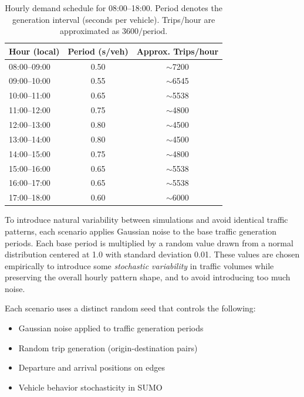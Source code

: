 \begin{table}[htbp]
    \centering
    \caption{Hourly demand schedule for 08:00--18:00. Period denotes the generation interval (seconds per vehicle). Trips/hour are approximated as $3600/\text{period}$.}
    \label{tab:hourly_schedule}
    \vspace{0.5em}
    \begin{tabular}{lcc}
        \toprule
        \textbf{Hour (local)} & \textbf{Period (s/veh)} & \textbf{Approx. Trips/hour} \\
        \midrule
        08:00--09:00 & 0.50 & $\sim$7200 \\
        09:00--10:00 & 0.55 & $\sim$6545 \\
        10:00--11:00 & 0.65 & $\sim$5538 \\
        11:00--12:00 & 0.75 & $\sim$4800 \\
        12:00--13:00 & 0.80 & $\sim$4500 \\
        13:00--14:00 & 0.80 & $\sim$4500 \\
        14:00--15:00 & 0.75 & $\sim$4800 \\
        15:00--16:00 & 0.65 & $\sim$5538 \\
        16:00--17:00 & 0.65 & $\sim$5538 \\
        17:00--18:00 & 0.60 & $\sim$6000 \\
        \bottomrule
    \end{tabular}
\end{table}

To introduce natural variability between simulations and avoid identical traffic patterns, each scenario applies Gaussian noise to the base traffic generation periods.
Each base period is multiplied by a random value drawn from a normal distribution centered at 1.0 with standard deviation 0.01. These values are chosen empirically to introduce some \emph{stochastic variability} in traffic volumes while preserving the overall hourly pattern shape, and to avoid introducing too much noise.

Each scenario uses a distinct random seed that controls the following:

\begin{itemize}
    \item Gaussian noise applied to traffic generation periods
    \item Random trip generation (origin-destination pairs)
    \item Departure and arrival positions on edges
    \item Vehicle behavior stochasticity in SUMO
\end{itemize}

